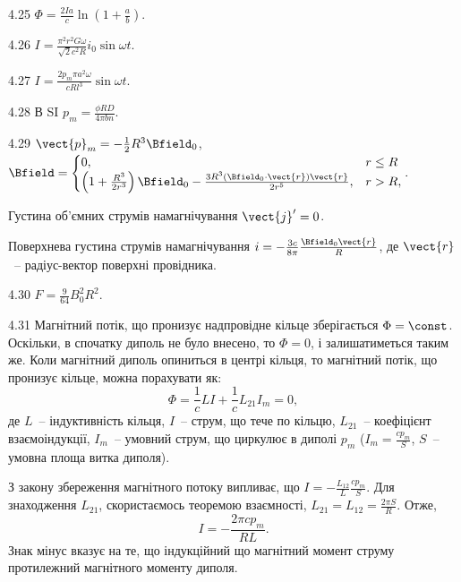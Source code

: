 \begin{Solution}{4.{25}}
	$\Phi = \frac{2Ia}{c}\ln\left( 1 + \frac{a}{b}\right) $.
\end{Solution}
\begin{Solution}{4.{26}}
	$I = \frac{\pi^2 r^2 G \omega}{\sqrt{2}c^2R}i_0\sin\omega t$.
\end{Solution}
\begin{Solution}{4.{27}}
	$I = \frac{2p_m\pi a^2\omega}{cRl^3}\sin\omega t$.
\end{Solution}
\begin{Solution}{4.{28}}
	В SI $p_m = \frac{\phi R D}{4\pi b n}$.
\end{Solution}
\begin{Solution}{4.{29}}
	$\vect{p}_m = - \frac12 R^3\Bfield_0$,
	$
		\Bfield =
		\begin{cases}
			0,                                                                                                & r \le R \\
			\left( 1 + \frac{R^3}{2r^3}\right)\Bfield_0 - \frac{3R^3(\Bfield_0\cdot \vect{r})\vect{r}}{2r^5}, & r > R,
		\end{cases}.
	$

	Густина об'ємних струмів намагнічування $\vect{j}' = 0$.

	Поверхнева густина струмів намагнічування
	$i = -\frac{3c}{8\pi} \frac{\Bfield_0\vect{r}}{R}$,
	де $\vect{r}$~-- радіус-вектор поверхні провідника.
\end{Solution}
\begin{Solution}{4.{30}}
	$F  = \frac{9}{64}B_0^2R^2$.
\end{Solution}
\begin{Solution}{4.{31}}
	Магнітний потік, що пронизує надпровідне кільце зберігається $\Phi = \const$. Оскільки, в спочатку диполь не було внесено, то $\Phi = 0$, і залишатиметься таким же. Коли магнітний диполь опиниться в центрі кільця, то магнітний потік, що пронизує кільце, можна порахувати як:
	\[
		\Phi = \frac1c LI + \frac1c L_{21}I_m = 0,
	\]
	де $L$~-- індуктивність кільця, $I$~-- струм, що тече по кільцю, $L_{21}$~-- коефіцієнт взаємоіндукції, $I_m$~-- умовний струм, що циркулює в диполі $p_m$ ($I_m = \frac{cp_m}{S}$, $S$~-- умовна площа витка диполя).

	З закону збереження магнітного потоку випливає, що $I = - \frac{L_{12}}{L}\frac{cp_m}{S}$.
	Для знаходження $L_{21}$, скористаємось теоремою взаємності, $L_{21} = L_{12} = \frac{2\pi S}{R}$.
	Отже,
	\[
		I = - \frac{ 2\pi c p_m}{RL}.
	\]
	Знак мінус вказує на те, що індукційний що магнітний момент струму протилежний магнітного моменту диполя.
\end{Solution}
